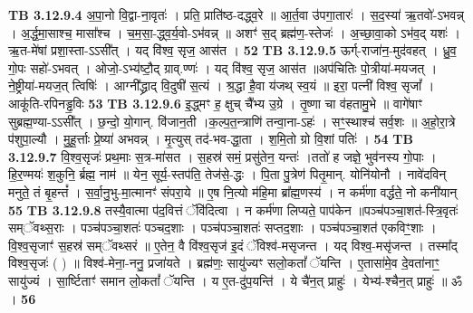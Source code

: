 \documentclass[17pt]{extarticle}
\begin{document}
{{{{{{{{{{{{{{{{{{{{{{{                  \newline
                                \textbf{ TB 3.12.9.4} \newline
                  अ॒पा॒नो वि॒द्वा-ना॒वृतः॑ । प्रति॒ प्राति॑ष्ठ-दद्ध्व॒रे ॥ आ॒र्त॒वा उ॑पगा॒तारः॑ । स॒द॒स्या॑ ऋ॒तवो॑-ऽभवन्न् । अ॒र्द्ध॒मा॒साश्च॒ मासा᳚श्च । च॒म॒सा॒-द्ध्व॒र्य॒वो-ऽभ॑वन्न् ॥ अशꣳ॑ स॒द् ब्रह्म॑ण॒-स्तेजः॑ । अ॒च्छा॒वा॒को ऽभ॑व॒द् यशः॑ । ऋ॒त-मे॑षां प्रशा॒स्ता-ऽऽसी᳚त् । यद् वि॑श्व॒ सृज॒ आस॑त । \textbf{ 52} \newline
                  \newline
                                \textbf{ TB 3.12.9.5} \newline
                  ऊर्ग्-राजा॑न॒-मुद॑वहत् । ध्रु॒व॒ गो॒पः सहो॑-ऽभवत् । ओजो॒-ऽभ्य॑ष्टौ॒द् ग्राव्.ण्णः॑ । यद् वि॑श्व॒ सृज॒ आस॑त ॥अप॑चितिः पो॒त्रीया॑-मयजत् । ने॒ष्ट्रीया॑-मयज॒त् त्विषिः॑ । आग्नी᳚द्ध्राद् वि॒दुषी॑ स॒त्यं । श्र॒द्धा है॒वा य॑जथ् स्व॒यं ॥ इरा॒ पत्नी॑ विश्व॒ सृजां᳚ । आकू॑ति-रपिनड्ढ॒विः \textbf{ 53} \newline
                  \newline
                                \textbf{ TB 3.12.9.6} \newline
                  इ॒द्ध्मꣳ ह॒ क्षुच् चै᳚भ्य उ॒ग्रे । तृ॒ष्णा चा व॑हतामु॒भे ॥ वागे॑षाꣳ सुब्रह्म॒ण्या-ऽऽसी᳚त् । छ॒न्दो॒ यो॒गान्. वि॑जान॒ती ।क॒ल्प॒त॒न्त्राणि॑ तन्वा॒ना-ऽहः॑ । सꣳ॒॒स्थाश्च॑ सर्व॒शः ॥ अ॒हो॒रा॒त्रे प॑शुपा॒ल्यौ । मु॒हू॒र्त्ताः प्रे॒ष्या॑ अभवन्न् । मृ॒त्युस् तद॑-भव-द्धा॒ता । श॒मि॒तो ग्रो वि॒शां पतिः॑ । \textbf{ 54} \newline
                  \newline
                                \textbf{ TB 3.12.9.7} \newline
                  वि॒श्व॒सृजः॑ प्रथ॒माः स॒त्र-मा॑सत । स॒हस्र॑ समं॒ प्रसु॑तेन॒ यन्तः॑ ।ततो॑ ह जज्ञे॒ भुव॑नस्य गो॒पाः । हि॒र॒ण्मयः॑ श॒कुनि॒ र्ब्रह्म॒ नाम॑ ॥ येन॒ सूर्य॒-स्तप॑ति॒ तेज॑से॒-द्धः । पि॒ता पु॒त्रेण॑ पितृ॒मान्. योनि॑योनौ । नावे॑दविन् मनुते॒ तं बृ॒हन्तं᳚ । स॒र्वा॒नु॒भु-मा॒त्मानꣳ॑ संपरा॒ये ॥ ए॒ष नि॒त्यो म॑हि॒मा ब्रा᳚ह्म॒णस्य॑ । न कर्म॑णा वर्द्धते॒ नो कनी॑यान् \textbf{ 55} \newline
                  \newline
                                \textbf{ TB 3.12.9.8} \newline
                  तस्यै॒वात्मा प॑द॒वित्तं ॅवि॑दित्वा । न कर्म॑णा लिप्यते॒ पाप॑केन ॥पञ्च॑पञ्चा॒शत॑-स्त्रि॒वृतः॑ सम्ॅवथ्स॒राः । पञ्च॑पञ्चा॒शतः॑ पञ्चद॒शाः । पञ्च॑पञ्चा॒शतः॑ सप्तद॒शाः । पञ्च॑पञ्चा॒शत॑ एकविꣳ॒॒शाः । वि॒श्व॒सृजाꣳ॑ स॒हस्र॑ सम्ॅवथ्सरं ॥ ए॒तेन॒ वै वि॑श्व॒सृज॑ इ॒दं ॅविश्व॑-मसृजन्त । यद् विश्व॒-मसृ॑जन्त । तस्मा᳚द् विश्व॒सृजः॑ ( ) ॥ विश्व॑-मेना॒-ननु॒ प्रजा॑यते । ब्रह्म॑णः॒ सायु॑ज्यꣳ सलो॒कतां᳚ ॅयन्ति । ए॒तासा॑मे॒व दे॒वता॑नाꣳ॒॒ सायु॑ज्यं । सा॒र्ष्टिताꣳ॑ समान लो॒कतां᳚ ॅयन्ति । य ए॒त-दु॑प॒यन्ति॑ । ये चै॑न॒त् प्राहुः॑ । येभ्य॑-श्चैन॒त् प्राहुः॑ ॥ ॐ । \textbf{ 56} \newline
}}}}}}}}}}}}}}}}}}}}}}}
\end{document}
